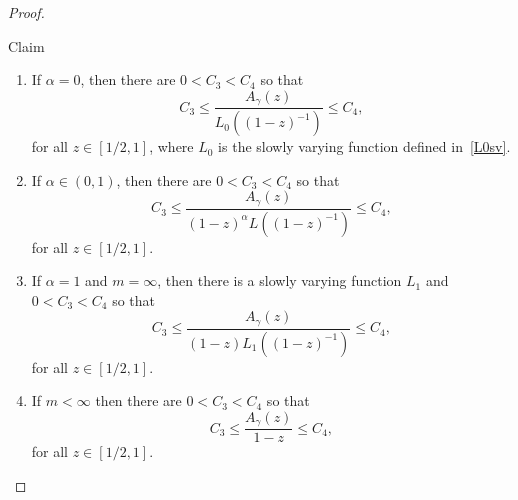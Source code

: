 \documentclass[10pt]{amsart}
\theoremstyle{definition}\newtheorem{defi}[theo]{Definition}\newtheorem{rema}[theo]{Remark}\newtheorem{exam}[theo]{Example}\newtheorem{exem}[theo]{Example}\newtheorem{nota}[theo]{Notation}
\newcommand{\ga}{\alpha}
\newcommand{\gga}{\gamma}
\newcommand*{\alphenumi}{\renewcommand*{\theenumi}{\alph{enumi}}}
\begin{document}
\begin{proof}
\begin{enonce*}{Claim} 
\begin{enumerate}\alphenumi
\item \label{c1} If $\ga = 0$, then there are $0 < C_3 < C_4$ so that
\begin{equation}\label{claim_a_zero}
C_3 \leq \frac{A_\gga(z)}{L_0((1 - z)^{-1})} \leq C_4,
\end{equation}
for all $z \in [1/2,1]$, where $L_0$ is the slowly varying function defined in~\eqref{L0sv}.
\item \label{c2} If $\ga \in (0,1)$, then there are $0 < C_3 < C_4$ so that
\begin{equation}
C_3 \leq \frac{A_\gga(z)}{(1 - z)^\ga L((1 - z)^{-1})} \leq C_4,
\end{equation}
for all $z \in [1/2,1]$.
\item \label{c3} If $\ga = 1$ and $m = \infty$, then there is a slowly varying function $L_1$ and $0 < C_3 < C_4$ so that
\begin{equation}
C_3 \leq \frac{A_\gga(z)}{(1 - z) L_1((1 - z)^{-1})} \leq C_4,
\end{equation}
for all $z \in [1/2,1]$.
\item \label{c4} If $m < \infty$ then there are $0 < C_3 < C_4$ so that
\begin{equation}
C_3 \leq \frac{A_\gga(z)}{1 - z} \leq C_4,
\end{equation}
for all $z\in[1/2, 1]$.
\end{enumerate}
\end{enonce*}


\end{proof}
\end{document}
